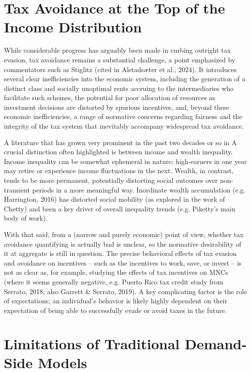 \section{Tax Avoidance at the Top of the Income Distribution}
\label{sec:1_1}
While considerable progress has arguably been made in curbing outright tax evasion, tax avoidance remains a substantial challenge, a point emphasized by commentators such as Stiglitz (cited in Alstadsæter et al., 2024). It introduces several clear inefficiencies into the economic system, including the generation of a distinct class and socially unoptimal rents accruing to the intermediaries who facilitate such schemes, the potential for poor allocation of resources as investment decisions are distorted by spurious incentives, and, beyond these economic inefficiencies, a range of normative concerns regarding fairness and the integrity of the tax system that inevitably accompany widespread tax avoidance.

A literature that has grown very prominent in the past two decades or so in  A crucial distinction often highlighted is between income and wealth inequality. Income inequality can be somewhat ephemeral in nature; high-earners in one year may retire or experience income fluctuations in the next. Wealth, in contrast, tends to be more permanent, potentially distorting social outcomes over non-transient periods in a more meaningful way. Inordinate wealth accumulation (e.g. Harrington, 2016) has distorted social mobility (as explored in the work of Chetty) and been a key driver of overall inequality trends (e.g. Piketty's main body of work). 

With that said, from a (narrow and purely economic) point of view, whether tax avoidance quantifying is actually bad is unclear, so the normative desirability of it at aggregate is still in question. The precise behavioral effects of tax evasion and avoidance on incentives – such as the incentives to work, save, or invest – is not as clear as, for example, studying the effects of tax incentives on MNCs (where it seems generally negative, e.g. Puerto Rico tax credit study from Serrato, 2018; also Garrett \& Serrato, 2019). A key complicating factor is the role of expectations; an individual's behavior is likely highly dependent on their expectation of being able to successfully evade or avoid taxes in the future. 

\section{Limitations of Traditional Demand-Side Models}
\label{sec:1_2}

